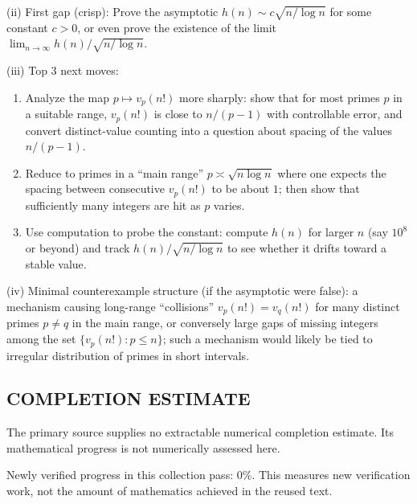 (ii) First gap (crisp): Prove the asymptotic $h(n)\sim c\sqrt{n/\log n}$ for some constant $c>0$, or even prove the existence of the limit $\lim_{n\to\infty} h(n)/\sqrt{n/\log n}$.

(iii) Top 3 next moves:
\begin{enumerate}
\item Analyze the map $p\mapsto v_p(n!)$ more sharply: show that for most primes $p$ in a suitable range, $v_p(n!)$ is close to $n/(p-1)$ with controllable error, and convert distinct-value counting into a question about spacing of the values $n/(p-1)$.
\item Reduce to primes in a ``main range'' $p\asymp \sqrt{n\log n}$ where one expects the spacing between consecutive $v_p(n!)$ to be about $1$; then show that sufficiently many integers are hit as $p$ varies.
\item Use computation to probe the constant: compute $h(n)$ for larger $n$ (say $10^8$ or beyond) and track $h(n)/\sqrt{n/\log n}$ to see whether it drifts toward a stable value.
\end{enumerate}

(iv) Minimal counterexample structure (if the asymptotic were false): a mechanism causing long-range ``collisions'' $v_p(n!)=v_q(n!)$ for many distinct primes $p\ne q$ in the main range, or conversely large gaps of missing integers among the set $\{v_p(n!):p\le n\}$; such a mechanism would likely be tied to irregular distribution of primes in short intervals.




\subsection*{COMPLETION ESTIMATE}
The primary source supplies no extractable numerical completion estimate. Its mathematical progress is not numerically assessed here.

Newly verified progress in this collection pass: $0\%$. This measures new verification work, not the amount of mathematics achieved in the reused text.
